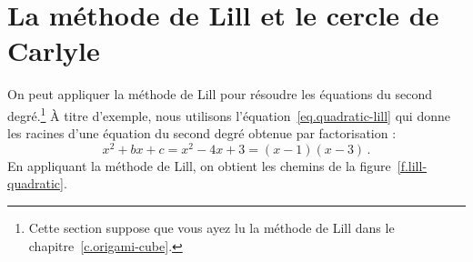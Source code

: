 
\section{La méthode de Lill et le cercle de Carlyle}\label{s.lill-quadratic}

On peut appliquer la méthode de Lill pour résoudre les équations du second degré.\footnote{Cette section suppose que vous ayez lu la méthode de Lill dans le chapitre~\ref{c.origami-cube}.} \`A titre d'exemple, nous utilisons l'équation~\ref{eq.quadratic-lill} qui donne les racines d'une équation du second degré obtenue par factorisation :
\[
x^2+bx+c=x^2-4x+3= (x-1)(x-3)\,.
\]
En appliquant la méthode de Lill, on obtient les chemins de  la figure~\ref{f.lill-quadratic}.

